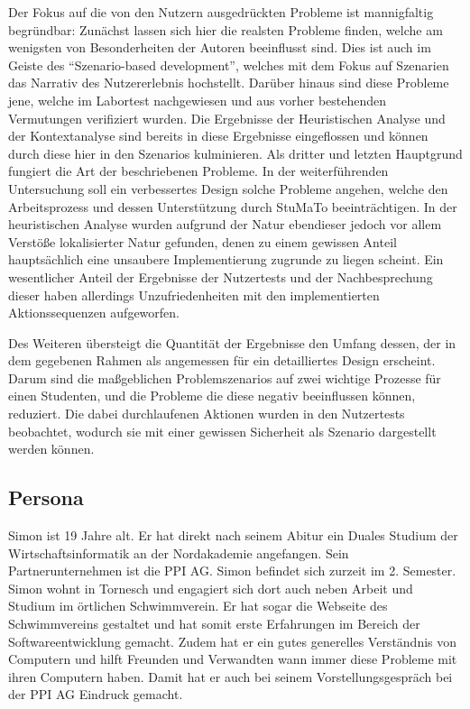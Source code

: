 \documentclass[
  12pt,
  ngerman,
  a4paper,
]{article}
\begin{document}
Der Fokus auf die von den Nutzern ausgedrückten Probleme ist
mannigfaltig begründbar: Zunächst lassen sich hier die realsten Probleme
finden, welche am wenigsten von Besonderheiten der Autoren beeinflusst
sind. Dies ist auch im Geiste des ``Szenario-based development'',
welches mit dem Fokus auf Szenarien das Narrativ des Nutzererlebnis
hochstellt. Darüber hinaus sind diese Probleme jene, welche im Labortest
nachgewiesen und aus vorher bestehenden Vermutungen verifiziert wurden.
Die Ergebnisse der Heuristischen Analyse und der Kontextanalyse sind
bereits in diese Ergebnisse eingeflossen und können durch diese hier in
den Szenarios kulminieren. Als dritter und letzten Hauptgrund fungiert
die Art der beschriebenen Probleme. In der weiterführenden Untersuchung
soll ein verbessertes Design solche Probleme angehen, welche den
Arbeitsprozess und dessen Unterstützung durch StuMaTo beeinträchtigen.
In der heuristischen Analyse wurden aufgrund der Natur ebendieser jedoch
vor allem Verstöße lokalisierter Natur gefunden, denen zu einem gewissen
Anteil hauptsächlich eine unsaubere Implementierung zugrunde zu liegen
scheint. Ein wesentlicher Anteil der Ergebnisse der Nutzertests und der
Nachbesprechung dieser haben allerdings Unzufriedenheiten mit den
implementierten Aktionssequenzen aufgeworfen.

Des Weiteren übersteigt die Quantität der Ergebnisse den Umfang dessen,
der in dem gegebenen Rahmen als angemessen für ein detailliertes Design
erscheint. Darum sind die maßgeblichen Problemszenarios auf zwei
wichtige Prozesse für einen Studenten, und die Probleme die diese
negativ beeinflussen können, reduziert. Die dabei durchlaufenen Aktionen
wurden in den Nutzertests beobachtet, wodurch sie mit einer gewissen
Sicherheit als Szenario dargestellt werden können.

\hypertarget{persona}{%
\subsection{Persona}\label{persona}}

Simon ist 19 Jahre alt. Er hat direkt nach seinem Abitur ein Duales
Studium der Wirtschaftsinformatik an der Nordakademie angefangen. Sein
Partnerunternehmen ist die PPI AG. Simon befindet sich zurzeit im 2.
Semester. Simon wohnt in Tornesch und engagiert sich dort auch neben
Arbeit und Studium im örtlichen Schwimmverein. Er hat sogar die Webseite
des Schwimmvereins gestaltet und hat somit erste Erfahrungen im Bereich
der Softwareentwicklung gemacht. Zudem hat er ein gutes generelles
Verständnis von Computern und hilft Freunden und Verwandten wann immer
diese Probleme mit ihren Computern haben. Damit hat er auch bei seinem
Vorstellungsgespräch bei der PPI AG Eindruck gemacht.
\end{document}
